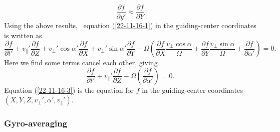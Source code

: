 \documentclass{llncs}
\begin{document}
\begin{equation}
  \frac{\partial f}{\partial y'} \approx \frac{\partial f}{\partial Y}
\end{equation}
Using the above results, \ equation (\ref{22-11-16-1}) in the guiding-center
coordinates is written as
\begin{equation}
  \frac{\partial f}{\partial t'} + v_{\parallel}' \frac{\partial f}{\partial
  Z} + v_{\perp}' \cos \alpha' \frac{\partial f}{\partial X} + v_{\perp}' \sin
  \alpha' \frac{\partial f}{\partial Y} - \Omega \left( \frac{\partial
  f}{\partial X} \frac{v_{\perp} \cos \alpha}{\Omega} + \frac{\partial
  f}{\partial Y} \frac{v_{\perp} \sin \alpha}{\Omega} + \frac{\partial
  f}{\partial \alpha'} \right) = 0.
\end{equation}
Here we find some terms cancel each other, giving
\begin{equation}
  \label{22-11-16-3} \frac{\partial f}{\partial t'} + v_{\parallel}'
  \frac{\partial f}{\partial Z} - \Omega \left( \frac{\partial f}{\partial
  \alpha'} \right) = 0.
\end{equation}
Equation (\ref{22-11-16-3}) is the equation for $f$ in the guiding-center
coordinates $(X, Y, Z, v_{\perp}', \alpha', v_{\parallel}')$.

\subsubsection{Gyro-averaging}
\end{document}
